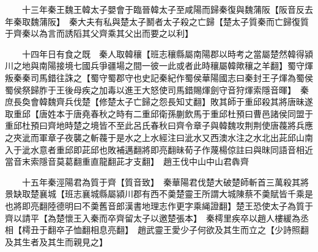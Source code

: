　　十三年秦王魏王韓太子嬰會于臨晉韓太子至咸陽而歸秦復與魏蒲阪【阪音反去年秦取魏蒲阪】　秦大夫有私與楚太子鬭者太子殺之亡歸【楚太子質秦而亡歸復質于齊秦以為言而誘䧟其父齊乘其父出而要之以利】

　　十四年日有食之既　秦人取韓穰【班志穰縣屬南陽郡以時考之當屬楚然韓得潁川之地與南陽接境七國兵爭疆場之間一彼一此或者此時穰屬韓歟穰之羊翻】蜀守煇叛秦秦司馬錯往誅之【蜀守蜀郡守也史記秦紀作蜀侯華陽國志曰秦封王子煇為蜀侯蜀侯祭歸胙于王後母疾之加毒以進王大怒使司馬錯賜煇劍守音狩煇索隱音暉】　秦庶長奐會韓魏齊兵伐楚【修楚太子亡歸之怨長知丈翻】敗其師于重邱殺其將唐昧遂取重邱【唐姓本于唐堯春秋之時有二重邱衛孫蒯飲馬于重邱杜預曰曹邑諸侯同盟于重邱杜預曰齊地時楚之境皆不至此呂氏春秋曰齊令章子與韓魏攻荆荆使唐薎將兵應之夾泚而軍章子夜襲之斬薎于是水之上水經注曰泚水又西澳水注之水北出茈邱山南入于泚水意者重邱即茈邱也敗補邁翻將即亮翻昧荀子作蔑楊倞註曰與昩同語音相近當音末索隱音莫葛翻重直龍翻茈才支翻】　趙王伐中山中山君犇齊

　　十五年秦涇陽君為質于齊【質音致】　秦華陽君伐楚大破楚師斬首三萬殺其將景缺取楚襄城【班志襄城縣屬潁川郡有西不羮楚靈王所謂大城陳蔡不羮賦皆千乘是也將即亮翻陸德明曰不羮舊音郎漢書地理志作更字乘䋲證翻】楚王恐使太子為質于齊以請平【為楚懷王入秦而卒齊留太子以邀楚張本】　秦樗里疾卒以趙人樓緩為丞相【樗丑于翻卒子恤翻相息亮翻】　趙武靈王愛少子何欲及其生而立之【少詩照翻及其生者及其生而親見之】

